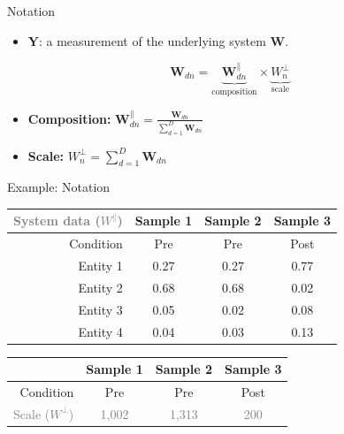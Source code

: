 \documentclass[
  ignorenonframetext,
]{beamer}
\providecommand{\tightlist}{%
  \setlength{\itemsep}{0pt}\setlength{\parskip}{0pt}}
\begin{document}
\begin{frame}{Notation}
\protect\hypertarget{notation}{}
\begin{itemize}
\tightlist
\item
  \(\mathbf{Y}\): a measurement of the underlying system \(\mathbf{W}\).
\end{itemize}

\[\mathbf{W}_{dn} = \underbrace{\mathbf{W}_{dn}^\parallel}_{\text{composition}} \times  \underbrace{W_n^\perp}_{\text{scale}}\]
\pause

\begin{itemize}
\item
  \textbf{Composition:}
  \(\mathbf{W}_{dn}^\parallel = \frac{\mathbf{W}_{dn}}{\sum_{d=1}^D \mathbf{W}_{dn}}\)
\item
  \textbf{Scale:} \(W_n^\perp = \sum_{d=1}^D \mathbf{W}_{dn}\)
\end{itemize}
\end{frame}

\begin{frame}{Example: Notation}
\protect\hypertarget{example-notation}{}
\begin{table}[h!]
\centering
\begin{tabular}{|r|c c c| }
\hline
\textcolor{gray}{System data ($W^\parallel$)} & Sample 1 & Sample 2 & Sample 3\\
\hline
Condition & Pre & Pre & Post\\
\hline
Entity 1 & 0.27 & 0.27 & 0.77 \\
Entity 2 & 0.68 & 0.68 & 0.02 \\
Entity 3 & 0.05 & 0.02 & 0.08 \\
Entity 4 & 0.04 & 0.03  & 0.13 \\
\hline
\end{tabular}
\end{table}

\begin{table}[h!]
\centering
\begin{tabular}{|r|c c c| }
\hline
 & Sample 1 & Sample 2 & Sample 3\\
\hline
Condition & Pre & Pre & Post\\
\hline
\textcolor{gray}{Scale ($W^\perp$)} & \textcolor{gray}{1,002} & \textcolor{gray}{1,313} & \textcolor{gray}{200}\\
\hline
\end{tabular}
\end{table}
\end{frame}
\end{document}
